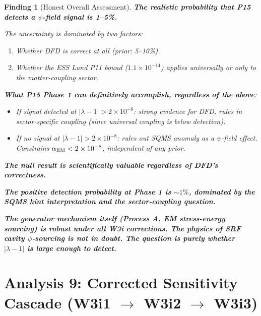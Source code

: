 \documentclass[11pt]{article}
\newtheorem{finding}{Finding}
\newcommand{\ee}[1]{\times 10^{#1}}
\newcommand{\lam}{\lambda}
\begin{document}
\begin{mdframed}[backgroundcolor=red!5,linecolor=red,linewidth=2pt]
\begin{finding}[Honest Overall Assessment]
\label{find:honest}
\textbf{The realistic probability that P15 detects a $\psi$-field signal is 1--5\%.}

The uncertainty is dominated by two factors:
\begin{enumerate}
\item Whether DFD is correct at all (prior: 5--10\%).
\item Whether the ESS Lund P11 bound ($1.1\ee{-14}$) applies universally or
only to the matter-coupling sector.
\end{enumerate}

\textbf{What P15 Phase 1 can definitively accomplish, regardless of the above}:
\begin{itemize}
\item If signal detected at $|\lam-1| > 2\ee{-8}$: strong evidence for DFD,
rules in sector-specific coupling (since universal coupling is below detection).
\item If no signal at $|\lam-1| > 2\ee{-8}$: rules out SQMS anomaly as a
$\psi$-field effect. Constrains $\alpha_{\rm EM} < 2\ee{-8}$, independent
of any prior.
\end{itemize}

\textbf{The null result is scientifically valuable regardless of DFD's correctness.}

\textbf{The positive detection probability at Phase 1 is $\sim 1\%$, dominated
by the SQMS hint interpretation and the sector-coupling question.}

\textbf{The generator mechanism itself (Process A, EM stress-energy sourcing)
is robust under all W3i corrections. The physics of SRF cavity $\psi$-sourcing
is not in doubt. The question is purely whether $|\lam-1|$ is large enough to
detect.}
\end{finding}
\end{mdframed}

\section{Analysis 9: Corrected Sensitivity Cascade (W3i1 $\to$ W3i2 $\to$ W3i3)}
\label{sec:cascade}
\end{document}
